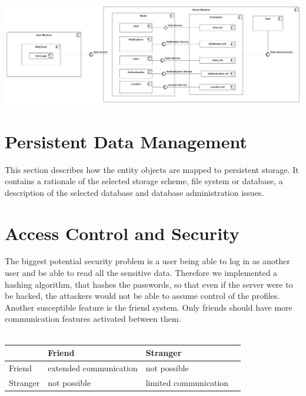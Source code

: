 \documentclass[a4paper,12pt]{scrartcl}
\begin{document}
    
    
    \includegraphics[scale=0.15]{HardwareSoftware.png}
    
    


    \section{Persistent Data Management}
    This section describes how the entity objects are mapped to persistent storage.
    It contains a rationale of the selected storage scheme, file system or database, a description of the selected database and database administration issues.


    \section{Access Control and Security}
    
    The biggest potential security problem is a user being able to log in as another user and be able to read all the sensitive data. Therefore we implemented a hashing algorithm, that hashes the passwords, so that even if the server were to be hacked, the attackers would not be able to assume control of the profiles. Another susceptible feature is the friend system. Only friends should have more communication features activated between them. \\ \\
    
    \begin{tabular}{    
	    |p{}%
        |p{}%
        |p{}
        |p{}|%
    }
        \hline
         & Friend & Stranger         \\
        \hline
        Friend   & extended communication  & not possible \\
        \hline
        Stranger & not possible & limited communication         \\
       
        \hline
    \end{tabular}
\end{document}

